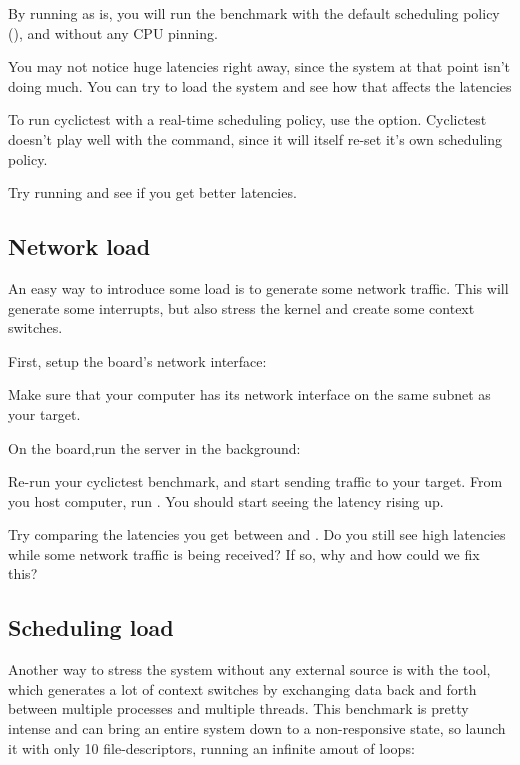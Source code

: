By running  as is, you will run the benchmark with the default
scheduling policy (), and without any CPU pinning.

You may not notice huge latencies right away, since the system at that point isn't
doing much. You can try to load the system and see how that affects the latencies

To run cyclictest with a real-time scheduling policy, use the  option.
Cyclictest doesn't play well with the  command, since it will itself re-set
it's own scheduling policy.

Try running  and see if you get better latencies.

\subsection{Network load}

An easy way to introduce some load is to generate some network traffic. This will
generate some interrupts, but also stress the kernel and create some context switches.

First, setup the board's network interface:



Make sure that your computer has its network interface on the same subnet as your
target.

On the board,run the  server in the background:


Re-run your cyclictest benchmark, and start sending traffic to your target. From
you host computer, run . You should start
seeing the latency rising up.

Try comparing the latencies you get between  and . Do you
still see high latencies while some network traffic is being received? If so, why and how
could we fix this?

\subsection{Scheduling load}

Another way to stress the system without any external source is with the 
tool, which generates a lot of context switches by exchanging data back and forth between
multiple processes and multiple threads. This benchmark is pretty intense and can bring
an entire system down to a non-responsive state, so launch it with only 10 file-descriptors,
running an infinite amout of loops:

